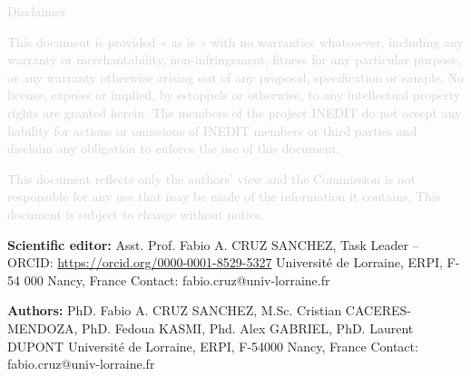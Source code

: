 \vfill

\begin{center}
\textcolor{lightgray}{Disclaimer}

\textcolor{lightgray}{
\small
This document is provided « as is » with no warranties whatsoever, including any warranty or merchantability, non-infringement, fitness for any particular purpose, or any warranty otherwise arising out of any proposal, specification or sample.  No license, express or implied, by estoppels or otherwise, to any intellectual property rights are granted herein. The members of the project INEDIT do not accept any liability for actions or omissions of INEDIT members or third parties and disclaim any obligation to enforce the use of this document. }

\textcolor{lightgray}{
This document reflects only the authors' view and the Commission is not responsible for any use that may be made of the information it contains.  This document is subject to change without notice. 
}
\end{center}
\normalsize


\newpage

\vfill



\textbf{Scientific editor:} \newline
Asst. Prof. Fabio A. CRUZ SANCHEZ, Task Leader – ORCID: \href{https://orcid.org/0000-0001-8529-5327}{https://orcid.org/0000-0001-8529-5327} \newline
Université de Lorraine, ERPI, F-54 000 Nancy, France \newline
Contact: fabio.cruz@univ-lorraine.fr 

\vspace{2cm}

\textbf{Authors:} \newline
PhD. Fabio A. CRUZ SANCHEZ, M.Sc. Cristian CACERES-MENDOZA, PhD. Fedoua KASMI, Phd. Alex GABRIEL, PhD. Laurent DUPONT \newline
Université de Lorraine, ERPI, F-54000 Nancy, France \newline
Contact: fabio.cruz@univ-lorraine.fr 

\vspace{2cm}

